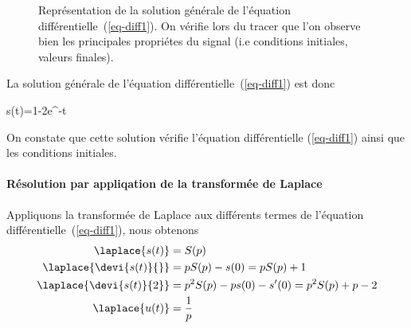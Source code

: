 \begin{figure}[!t]
    \centering
    \caption{Représentation de la solution générale de l'équation différentielle~(\ref{eq-diff1}). On vérifie lors 
    du tracer que l'on observe bien les principales propriétes du signal (i.e conditions initiales, valeurs finales).}
\end{figure}

La solution générale de l'équation différentielle~(\ref{eq-diff1}) est donc 
\begin{bequation}
s(t)=1-2e^{-t}
\end{bequation}
On constate que cette solution vérifie l'équation différentielle (\ref{eq-diff1}) ainsi que les 
conditions initiales.

\paragraph{Résolution par appliqation de la transformée de Laplace}

Appliquons la transformée de Laplace aux différents termes de l'équation différentielle~(\ref{eq-diff1}),
nous obtenons
\begin{align*}
    \laplace{s(t)} &= S(p) \\
    \laplace{\devi{s(t)}{}} &= pS(p)-s(0) = pS(p) +1 \\
    \laplace{\devi{s(t)}{2}} &= p^2S(p)-ps(0)-s'(0) = p^2S(p) + p -2\\
    \laplace{u(t)} &= \dfrac{1}{p}
\end{align*}

